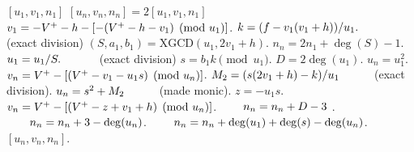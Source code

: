 \begin{algorithm}[htbp]
\caption{Genus 2 Split Model Double (Positive Reduced Balanced NUDUPL)}
\label{alg:g2balnudupl}
\begin{algorithmic}[1]
\Require $[u_1,v_1,n_1]$
\Ensure $[u_n,v_n,n_n] = 2[u_1,v_1,n_1]$
    \State $v_1 = -V^{+} - h - [-(V^{+} - h - v_1) \pmod{u_1}]$.
\EndIf
\State $k = (f - v_1(v_1 + h))/u_1. \quad\quad\quad$ (exact division)
\State $(S,a_1,b_1) = \mathrm{XGCD}(u_1,2v_1 + h)$.
\State $n_n = 2n_1 + \deg(S) - 1$.
    \State $u_1 = u_1/S. \quad\quad\quad$ (exact division)   
\EndIf
\State $s = b_1k \pmod{u_1}$.
\State $D = 2\deg(u_1)$.
    \State $u_n = u_1^2$.
    \State $v_n = V^{+} - [(V^{+} - v_1 - u_1s) \pmod{u_n}]$.
\Else
    \State $M_2 = (s(2v_1 + h) - k)/u_1 \quad\quad\quad $(exact division).
    \State $u_n = s^2 + M_2 \quad\quad\quad$(made monic).
    \State $z = -u_1s$.
    \State $v_n = V^{+} - [(V^{+} - z + v_1 + h) \pmod{u_n}]$.
         $\quad\quad n_n = n_n + D - 3$ .
        \Else \hspace{101pt} $\quad\quad n_n = n_n + 3 - \deg(u_n)$. 
        \EndIf
    \Else $\quad\quad n_n = n_n + \deg(u_1) + \deg(s) - \deg(u_n)$.
    \EndIf
\EndIf
\State \Return $[u_n,v_n,n_n]$.
\end{algorithmic}
\end{algorithm}


